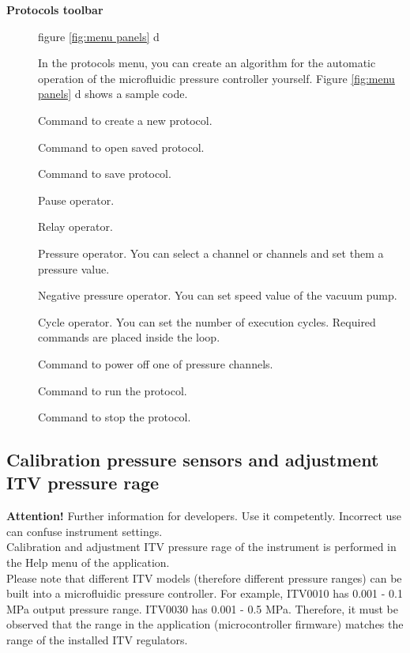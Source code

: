 \documentclass[twoside, 12pt, a4paper]{refart}
\begin{document}
\begin{description}
    \item[\textbf{Protocols toolbar}] figure \ref{fig:menu panels} d
      
      In the protocols menu, you can create an algorithm for the automatic operation of the microfluidic pressure controller yourself. Figure \ref{fig:menu panels} d shows a sample code.
      
       Command to create a new protocol.
      
       Command to open saved protocol.  
      
       Command to save protocol.  
      
       Pause operator. 
       
       Relay operator. 
       
       Pressure operator. You can select a channel or channels and set them a pressure value.  
      
       Negative pressure operator. You can set speed value of the vacuum pump.  
      
       Cycle operator. You can set the number of execution cycles. Required commands are placed inside the loop.  
      
       Command to power off one of pressure channels.  
      
       Command to run the protocol. 
      
       Command to stop the protocol.  

     
    \end{description}     
  
  \subsection{Calibration pressure sensors and adjustment ITV pressure rage}
    
    \textbf{Attention!} Further information for developers. Use it competently. Incorrect use can confuse instrument settings.\\
    Calibration and adjustment ITV pressure rage of the instrument is performed in the Help menu of the application.\\
    
    Please note that different ITV models (therefore different pressure ranges) can be built into a microfluidic pressure controller. For example, ITV0010 has 0.001 - 0.1 MPa output pressure range. ITV0030 has 0.001 - 0.5 MPa. Therefore, it must be observed that the range in the application (microcontroller firmware) matches the range of the installed ITV regulators.\\
    
\end{document}
